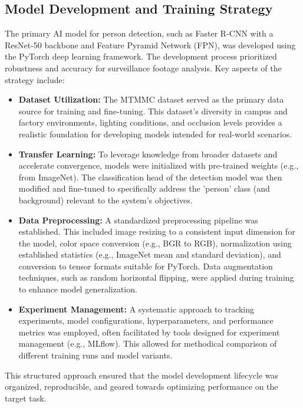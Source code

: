 \subsection{Model Development and Training Strategy}
\label{subsection:model_dev_train_strat_new}
The primary AI model for person detection, such as Faster R-CNN with a ResNet-50 backbone and Feature Pyramid Network (FPN), was developed using the PyTorch deep learning framework. The development process prioritized robustness and accuracy for surveillance footage analysis.
Key aspects of the strategy include:
\begin{itemize}
    \item \textbf{Dataset Utilization:} The MTMMC dataset served as the primary data source for training and fine-tuning. This dataset's diversity in campus and factory environments, lighting conditions, and occlusion levels provides a realistic foundation for developing models intended for real-world scenarios.
    \item \textbf{Transfer Learning:} To leverage knowledge from broader datasets and accelerate convergence, models were initialized with pre-trained weights (e.g., from ImageNet). The classification head of the detection model was then modified and fine-tuned to specifically address the 'person' class (and background) relevant to the system's objectives.
    \item \textbf{Data Preprocessing:} A standardized preprocessing pipeline was established. This included image resizing to a consistent input dimension for the model, color space conversion (e.g., BGR to RGB), normalization using established statistics (e.g., ImageNet mean and standard deviation), and conversion to tensor formats suitable for PyTorch. Data augmentation techniques, such as random horizontal flipping, were applied during training to enhance model generalization.
    \item \textbf{Experiment Management:} A systematic approach to tracking experiments, model configurations, hyperparameters, and performance metrics was employed, often facilitated by tools designed for experiment management (e.g., MLflow). This allowed for methodical comparison of different training runs and model variants.
\end{itemize}
This structured approach ensured that the model development lifecycle was organized, reproducible, and geared towards optimizing performance on the target task.

